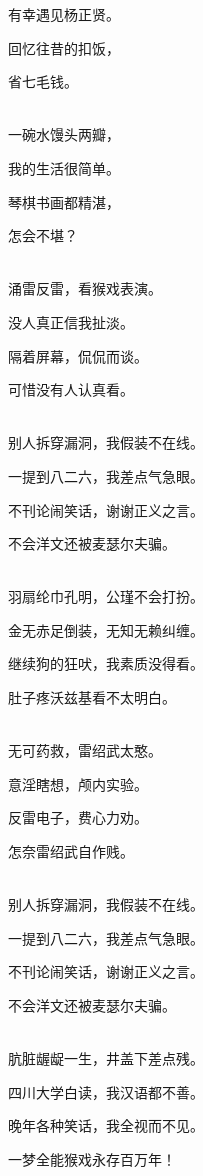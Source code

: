 \documentclass[UTF8,12pt,oneside]{ctexbook}
\begin{document}
\begin{center}
            有幸遇见杨正贤。
            
            回忆往昔的扣饭，
            
            省七毛钱。
            
            ~\\
            一碗水馒头两瓣，
            
            我的生活很简单。
            
            琴棋书画都精湛，
            
            怎会不堪？
            
            ~\\
            涌雷反雷，看猴戏表演。
            
            没人真正信我扯淡。
            
            隔着屏幕，侃侃而谈。
            
            可惜没有人认真看。
            
            ~\\
            别人拆穿漏洞，我假装不在线。
            
            一提到八二六，我差点气急眼。
            
            不刊论闹笑话，谢谢正义之言。
            
            不会洋文还被麦瑟尔夫骗。
            
            ~\\
            羽扇纶巾孔明，公瑾不会打扮。
            
            金无赤足倒装，无知无赖纠缠。
            
            继续狗的狂吠，我素质没得看。
            
            肚子疼沃兹基看不太明白。
            
            ~\\
            无可药救，雷绍武太憨。
            
            意淫瞎想，颅内实验。
            
            反雷电子，费心力劝。
            
            怎奈雷绍武自作贱。
            
            ~\\
            别人拆穿漏洞，我假装不在线。
            
            一提到八二六，我差点气急眼。
            
            不刊论闹笑话，谢谢正义之言。
            
            不会洋文还被麦瑟尔夫骗。
            
            ~\\
            肮脏龌龊一生，井盖下差点残。
            
            四川大学白读，我汉语都不善。
            
            晚年各种笑话，我全视而不见。
            
            一梦全能猴戏永存百万年！
        \end{center}
        
\end{document}
